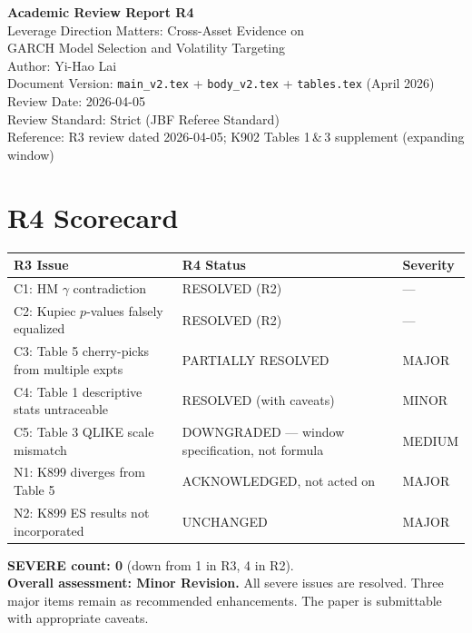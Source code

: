\documentclass[12pt,a4paper]{article}
\begin{document}
\begin{center}
{\Large\bfseries Academic Review Report R4}\\[0.5em]
{\large Leverage Direction Matters: Cross-Asset Evidence on\\GARCH Model Selection and Volatility Targeting}\\[0.5em]
{\normalsize Author: Yi-Hao Lai}\\[0.3em]
{\normalsize Document Version: \texttt{main\_v2.tex} + \texttt{body\_v2.tex} + \texttt{tables.tex} (April 2026)}\\
{\normalsize Review Date: 2026-04-05}\\
{\normalsize Review Standard: Strict (JBF Referee Standard)}\\
{\normalsize Reference: R3 review dated 2026-04-05; K902 Tables 1\,\&\,3 supplement (expanding window)}
\end{center}

\bigskip

\section*{R4 Scorecard}

\begin{tabular}{lll}
\toprule
\textbf{R3 Issue} & \textbf{R4 Status} & \textbf{Severity} \\
\midrule
C1: HM $\gamma$ contradiction & \textcolor{okgreen}{RESOLVED (R2)} & --- \\
C2: Kupiec $p$-values falsely equalized & \textcolor{okgreen}{RESOLVED (R2)} & --- \\
C3: Table 5 cherry-picks from multiple expts & \textcolor{warncolor}{PARTIALLY RESOLVED} & MAJOR \\
C4: Table 1 descriptive stats untraceable & \textcolor{resolved}{RESOLVED (with caveats)} & MINOR \\
C5: Table 3 QLIKE scale mismatch & \textcolor{resolved}{DOWNGRADED --- window specification, not formula} & MEDIUM \\
\addlinespace
N1: K899 diverges from Table 5 & \textcolor{warncolor}{ACKNOWLEDGED, not acted on} & MAJOR \\
N2: K899 ES results not incorporated & \textcolor{warncolor}{UNCHANGED} & MAJOR \\
\bottomrule
\end{tabular}

\medskip

\noindent\textbf{SEVERE count: 0} (down from 1 in R3, 4 in R2).\\
\textbf{Overall assessment: Minor Revision.} All severe issues are resolved. Three major items remain as recommended enhancements. The paper is submittable with appropriate caveats.
\end{document}
